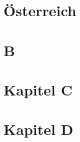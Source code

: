 \documentclass{book}
\begin{document}
\chapter{^^d6sterreich}
\clearpage
\null\clearpage
\null\clearpage
\chapter{B}
\clearpage
\null\clearpage
\chapter{Kapitel C}
\clearpage
\null\clearpage
\null\clearpage
\null\clearpage
\chapter{Kapitel D}
\end{document}
